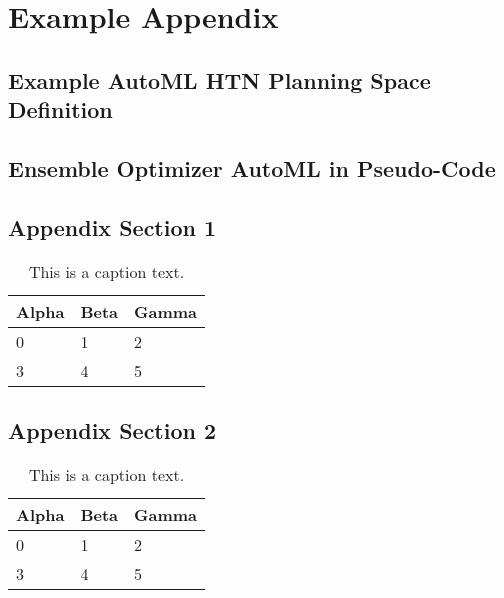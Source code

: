 %
\chapter{Example Appendix}
\label{sec:appendix}

\Blindtext[1][1]

\section{Example AutoML HTN Planning Space Definition}
\label{sec:appendix:htn-space}

\Blindtext[1][1]

\section{Ensemble Optimizer AutoML in Pseudo-Code}
\label{sec:appendix:pseudo-code}

\Blindtext[1][1]

\section{Appendix Section 1}
\label{sec:appendix:sec1}

\Blindtext[1][1]

\begin{table}[h]
	\begin{tabularx}{\textwidth}{X | X | X}
		Alpha		& Beta			& Gamma			\\ \hline
		0			& 1				& 2				\\ \hline
		3			& 4				& 5				\\ %
	\end{tabularx}
	\label{tab:table1}
	\caption{This is a caption text.}
\end{table}

\section{Appendix Section 2}
\label{sec:appendix:sec2}

\Blindtext[1][1]

\begin{table}[h]
	\begin{tabularx}{\textwidth}{X | X | X}
		Alpha		& Beta			& Gamma			\\ \hline
		0			& 1				& 2				\\ \hline
		3			& 4				& 5				\\ %
	\end{tabularx}
	\label{tab:table2}
	\caption{This is a caption text.}
\end{table}

\Blindtext[1][2]
